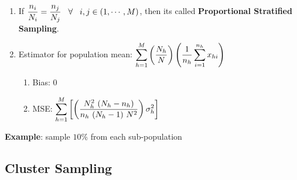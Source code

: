 \begin{enumerate}[itemsep=0.3cm]
    \item If $
        \dfrac{n_i}{N_i} = \dfrac{n_j}{N_j} 
        \hspace{0.3cm} 
        \forall 
        \hspace{0.3cm} 
        i,j \in \left(1,\cdots,M\right) 
    $, then its called \textbf{Proportional Stratified Sampling}.\label{Sampling Plans/Representative Sampling/Stratified Sampling/Proportional Stratified Sampling}
    \hfill \cite{statistics/book/Statistics-for-Data-Scientists/Maurits-Kaptein}

    \item Estimator for population mean: $
        \displaystyle\sum_{h=1}^{M}
        \left(\dfrac{N_h}{N}\right)
        \left(\dfrac{1}{n_h} \displaystyle\sum_{i=1}^{n_h} x_{hi}\right)
    $
    \hfill \cite{statistics/book/Statistics-for-Data-Scientists/Maurits-Kaptein}
    \begin{enumerate}[itemsep=0.2cm]
        \item Bias: $0$
        \hfill \cite{statistics/book/Statistics-for-Data-Scientists/Maurits-Kaptein}

        \item MSE: $
            \displaystyle\sum_{h=1}^{M}
            \left[
                \left(
                    \dfrac{
                        N_h^2\ (N_h - n_h)
                    }{
                        n_h\ (N_h-1)\ N^2
                    }
                \right) \sigma_h^2
            \right]
        $
        \hfill \cite{statistics/book/Statistics-for-Data-Scientists/Maurits-Kaptein}
    \end{enumerate}

\end{enumerate}


\vspace{0.5cm}
\textbf{Example}: sample $10\%$ from each sub-population







\subsection{Cluster Sampling \cite{statistics/book/Statistics-for-Data-Scientists/Maurits-Kaptein}}\label{Sampling Plans/Representative Sampling/Cluster Sampling}


